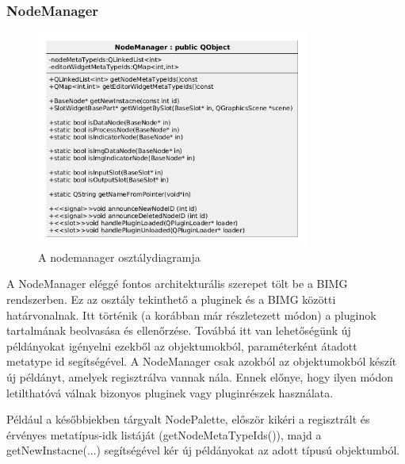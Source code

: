 \documentclass[a4paper,12pt,oneside]{report}
\begin{document}
\subsubsection{NodeManager}
\begin{center}
\begin{figure}[h]
  \includegraphics[width=0.8\textwidth]{nodeman_diag.png}
  \caption{A nodemanager osztálydiagramja }

  \label{fig:bimg_slot_diag}
\end{figure}
\end{center}
A NodeManager eléggé fontos architekturális szerepet tölt be a BIMG rendszerben. Ez az osztály tekinthető a pluginek és a BIMG közötti határvonalnak. Itt történik (a korábban már részletezett módon) a pluginok tartalmának beolvasása és ellenőrzése. Továbbá itt van lehetőségünk új példányokat igényelni ezekből az objektumokból, paraméterként átadott metatype id segítségével. A NodeManager csak azokból az objektumokból készít új példányt, amelyek regisztrálva vannak nála. Ennek előnye, hogy ilyen módon letilthatóvá válnak bizonyos pluginek vagy pluginrészek használata.

Például a későbbiekben tárgyalt NodePalette, először kikéri a regisztrált és érvényes metatípus-idk listáját (getNodeMetaTypeIds()), majd a getNewInstacne(...) segítségével kér új példányokat az adott típusú objektumból.
\end{document}
